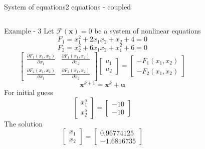 \documentclass{beamer}
\begin{document}
\begin{frame}{System of equations}{2 equations - coupled}
    \vspace{-2em}
    \begin{columns}[t]
        \begin{block}{\footnotesize Example - 3}
            \scriptsize
            Let $\mathcal{F}(\textbf{x})=0$ be a system of nonlinear equations
            \[F_1 = x_1^{2}+2x_1x_2+x_2+4=0\]
            \vspace{-2em}
            \[F_2 = x_2^{2}+6x_1x_2+x_1^{2}+6=0\]
            \[
                \begin{bmatrix}
                    \frac{\partial F_1(x_1,x_2)}{\partial x_1} & \frac{\partial F_1(x_1,x_2)}{\partial x_2} \\
                    \frac{\partial F_2(x_1,x_2)}{\partial x_1} & \frac{\partial F_2(x_1,x_2)}{\partial x_2}
                \end{bmatrix}
                \begin{bmatrix}
                    u_1 \\ u_2
                \end{bmatrix}
                =
                \begin{bmatrix}
                    -F_1(x_1,x_2) \\
                    -F_2(x_1,x_2) 
                \end{bmatrix}
            \]
            \[\textbf{x}^{k+1}=\textbf{x}^k+\textbf{u}\]
            For initial guess
            \vspace{-1em}
            \[
                \begin{bmatrix}
                    x_1^o \\ x_2^o
                \end{bmatrix}
                =
                \begin{bmatrix}
                    -10 \\ -10
                \end{bmatrix}
            \]
            The solution
            \vspace{-1em}
            \[
                \begin{bmatrix}
                    x_1 \\ x_2
                \end{bmatrix}
                =
                \begin{bmatrix}
                    0.96774125 \\ -1.6816735

\end{bmatrix}\]
\end{block}
\end{columns}
\end{frame}
\end{document}
